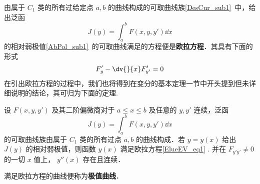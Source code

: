 
由属于 $C_1$ 类的所有过给定点 $a,b$ 的曲线构成的可取曲线族\autoref{DesCur_sub1}~中，给出泛函 
\begin{equation}
J(y)=\int_a^bF(x,y,y')\dd x
\end{equation}
的相对弱极值\autoref{AbPol_sub1}~的可取曲线满足的方程便是\textbf{欧拉方程}．其具有下面的形式
\begin{equation}\label{ElueEV_eq1}
F'_y-\dv{}{x}F'_{y'}=0
\end{equation}
在引出欧拉方程的过程中，我们也将得到在变分的基本定理一节中开头提到但未详细说明的结论，其可归为下面的定理.
\begin{theorem}{}
设 $F(x,y,y')$ 及其二阶偏微商对于 $a\leq x\leq b$ 及任意的 $y,y'$ 连续，泛函
\begin{equation}
J(y)=\int_a^b F(x,y,y')\dd x
\end{equation}
的可取曲线族由属于 $C_1$ 类的所有过点 $a,b$ 的曲线构成．若 $y=y(x)$ 给出 $J(y)$ 的相对弱极值，则函数 $y(x)$ 满足欧拉方程\autoref{ElueEV_eq1} .
并在 $F_{y'y'}\neq0$ 的一切 $x$ 值上， $y''(x)$ 存在且连续．

\end{theorem}
满足欧拉方程的曲线便称为\textbf{极值曲线}．